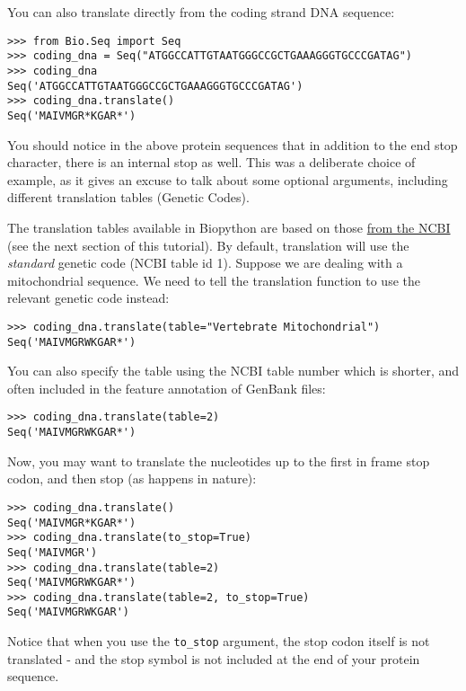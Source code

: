 You can also translate directly from the coding strand DNA sequence:

\begin{verbatim}
>>> from Bio.Seq import Seq
>>> coding_dna = Seq("ATGGCCATTGTAATGGGCCGCTGAAAGGGTGCCCGATAG")
>>> coding_dna
Seq('ATGGCCATTGTAATGGGCCGCTGAAAGGGTGCCCGATAG')
>>> coding_dna.translate()
Seq('MAIVMGR*KGAR*')
\end{verbatim}

You should notice in the above protein sequences that in addition to the end stop character, there is an internal stop as well.  This was a deliberate choice of example, as it gives an excuse to talk about some optional arguments, including different translation tables (Genetic Codes).

The translation tables available in Biopython are based on those \href{https://www.ncbi.nlm.nih.gov/Taxonomy/Utils/wprintgc.cgi}{from the NCBI} (see the next section of this tutorial).  By default, translation will use the \emph{standard} genetic code (NCBI table id 1).
Suppose we are dealing with a mitochondrial sequence.  We need to tell the translation function to use the relevant genetic code instead:

\begin{verbatim}
>>> coding_dna.translate(table="Vertebrate Mitochondrial")
Seq('MAIVMGRWKGAR*')
\end{verbatim}

You can also specify the table using the NCBI table number which is shorter, and often included in the feature annotation of GenBank files:

\begin{verbatim}
>>> coding_dna.translate(table=2)
Seq('MAIVMGRWKGAR*')
\end{verbatim}

Now, you may want to translate the nucleotides up to the first in frame stop codon,
and then stop (as happens in nature):

\begin{verbatim}
>>> coding_dna.translate()
Seq('MAIVMGR*KGAR*')
>>> coding_dna.translate(to_stop=True)
Seq('MAIVMGR')
>>> coding_dna.translate(table=2)
Seq('MAIVMGRWKGAR*')
>>> coding_dna.translate(table=2, to_stop=True)
Seq('MAIVMGRWKGAR')
\end{verbatim}
\noindent Notice that when you use the \verb|to_stop| argument, the stop codon itself
is not translated - and the stop symbol is not included at the end of your protein
sequence.

